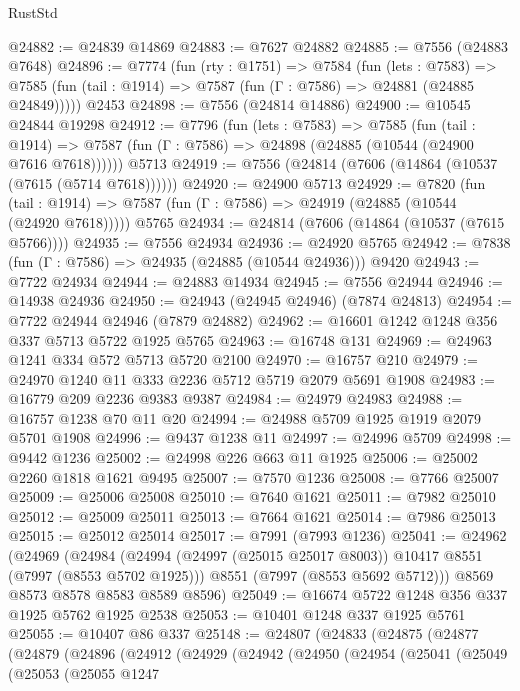 \begin{lexlean}{RustStd}
\begin{coremodule}
{\begin{coremodule}
{{{{{{{{{{{{{{{{{{{{{{{{{{{{{{{{{{{{{{{{{{{@24882 := @24839 @14869
@24883 := @7627 @24882
@24885 := @7556 (@24883 @7648)
@24896 := @7774
    (fun (rty : @1751) =>
    @7584
      (fun (lets : @7583) =>
      @7585 (fun (tail : @1914) => @7587 (fun (Γ : @7586) => @24881 (@24885 @24849)))))
    @2453
@24898 := @7556 (@24814 @14886)
@24900 := @10545 @24844 @19298
@24912 := @7796
    (fun (lets : @7583) =>
    @7585
      (fun (tail : @1914) =>
      @7587 (fun (Γ : @7586) => @24898 (@24885 (@10544 (@24900 @7616 @7618))))))
    @5713
@24919 := @7556 (@24814 (@7606 (@14864 (@10537 (@7615 (@5714 @7618))))))
@24920 := @24900 @5713
@24929 := @7820
    (fun (tail : @1914) => @7587 (fun (Γ : @7586) => @24919 (@24885 (@10544 (@24920 @7618)))))
    @5765
@24934 := @24814 (@7606 (@14864 (@10537 (@7615 @5766))))
@24935 := @7556 @24934
@24936 := @24920 @5765
@24942 := @7838 (fun (Γ : @7586) => @24935 (@24885 (@10544 @24936))) @9420
@24943 := @7722 @24934
@24944 := @24883 @14934
@24945 := @7556 @24944
@24946 := @14938 @24936
@24950 := @24943 (@24945 @24946) (@7874 @24813)
@24954 := @7722 @24944 @24946 (@7879 @24882)
@24962 := @16601 @1242 @1248 @356 @337 @5713 @5722 @1925 @5765
@24963 := @16748 @131
@24969 := @24963 @1241 @334 @572 @5713 @5720 @2100
@24970 := @16757 @210
@24979 := @24970 @1240 @11 @333 @2236 @5712 @5719 @2079 @5691 @1908
@24983 := @16779 @209 @2236 @9383 @9387
@24984 := @24979 @24983
@24988 := @16757 @1238 @70 @11 @20
@24994 := @24988 @5709 @1925 @1919 @2079 @5701 @1908
@24996 := @9437 @1238 @11
@24997 := @24996 @5709
@24998 := @9442 @1236
@25002 := @24998 @226 @663 @11 @1925
@25006 := @25002 @2260 @1818 @1621 @9495
@25007 := @7570 @1236
@25008 := @7766 @25007
@25009 := @25006 @25008
@25010 := @7640 @1621
@25011 := @7982 @25010
@25012 := @25009 @25011
@25013 := @7664 @1621
@25014 := @7986 @25013
@25015 := @25012 @25014
@25017 := @7991 (@7993 @1236)
@25041 := @24962
    (@24969
      (@24984
        (@24994 (@24997 (@25015 @25017 @8003)) @10417 @8551 (@7997 (@8553 @5702 @1925)))
        @8551
        (@7997 (@8553 @5692 @5712)))
      @8569
      @8573
      @8578
      @8583
      @8589
      @8596)
@25049 := @16674 @5722 @1248 @356 @337 @1925 @5762 @1925 @2538
@25053 := @10401 @1248 @337 @1925 @5761
@25055 := @10407 @86 @337
@25148 := @24807
    (@24833
      (@24875
        (@24877
          (@24879
            (@24896
              (@24912
                (@24929
                  (@24942
                    (@24950
                      (@24954
                        (@25041
                          (@25049
                            (@25053
                              (@25055
                                @1247
}}}}}}}}}}}}}}}}}}}}}}}}}}}}}}}}}}}}}}}}}}}
\end{coremodule}}
\end{coremodule}
\end{lexlean}
